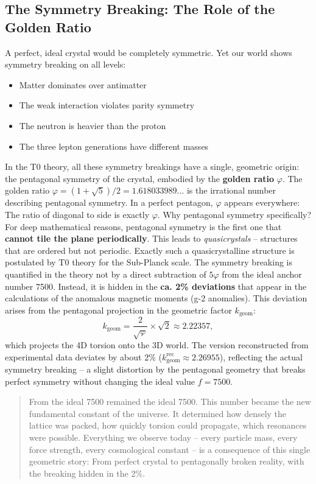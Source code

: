 	\subsection{The Symmetry Breaking: The Role of the Golden Ratio}
	A perfect, ideal crystal would be completely symmetric. Yet our world shows symmetry breaking on all levels:
	\begin{itemize}
		\item Matter dominates over antimatter
		\item The weak interaction violates parity symmetry
		\item The neutron is heavier than the proton
		\item The three lepton generations have different masses
	\end{itemize}
	In the T0 theory, all these symmetry breakings have a single, geometric origin: the pentagonal symmetry of the crystal, embodied by the \textbf{golden ratio} \(\varphi\).
	The golden ratio \(\varphi = (1+\sqrt{5})/2 = 1.618033989\ldots\) is the irrational number describing pentagonal symmetry. In a perfect pentagon, \(\varphi\) appears everywhere: The ratio of diagonal to side is exactly \(\varphi\).
	Why pentagonal symmetry specifically? For deep mathematical reasons, pentagonal symmetry is the first one that \textbf{cannot tile the plane periodically}. This leads to \emph{quasicrystals} – structures that are ordered but not periodic. Exactly such a quasicrystalline structure is postulated by T0 theory for the Sub-Planck scale.
	The symmetry breaking is quantified in the theory not by a direct subtraction of \(5\varphi\) from the ideal anchor number 7500. Instead, it is hidden in the \textbf{ca. 2\% deviations} that appear in the calculations of the anomalous magnetic moments (g-2 anomalies). This deviation arises from the pentagonal projection in the geometric factor \(k_\text{geom}\):
	\begin{equation}
		k_\text{geom} = \frac{2}{\sqrt{\varphi}} \times \sqrt{2} \approx 2.22357,
	\end{equation}
	which projects the 4D torsion onto the 3D world. The version reconstructed from experimental data deviates by about 2\% (\(k_\text{geom}^\text{rec} \approx 2.26955\)), reflecting the actual symmetry breaking – a slight distortion by the pentagonal geometry that breaks perfect symmetry without changing the ideal value \(f = 7500\).
	\begin{quotation}
		From the ideal 7500 remained the ideal 7500. This number became the new fundamental constant of the universe. It determined how densely the lattice was packed, how quickly torsion could propagate, which resonances were possible.
		Everything we observe today – every particle mass, every force strength, every cosmological constant – is a consequence of this single geometric story: From perfect crystal to pentagonally broken reality, with the breaking hidden in the 2\%.
	\end{quotation}
	
